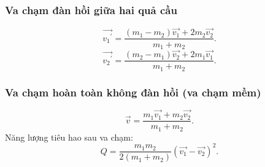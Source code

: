 \subsubsection{Va chạm đàn hồi giữa hai quả cầu}
$$\overrightarrow {{v_1}^\prime }  = \frac{{\left( {{m_1} - {m_2}} \right)\overrightarrow {{v_1}}  + 2{m_2}\overrightarrow {{v_2}} }}{{{m_1} + {m_2}}}.$$
$$\overrightarrow {{v_2}^\prime }  = \frac{{\left( {{m_2} - {m_1}} \right)\overrightarrow {{v_2}}  + 2{m_1}\overrightarrow {{v_1}} }}{{{m_1} + {m_2}}}.$$
\subsubsection{Va chạm hoàn toàn không đàn hồi (va chạm mềm)}
$$\overrightarrow v  = \frac{{{m_1}\overrightarrow {{v_1}}  + {m_2}\overrightarrow {{v_2}} }}{{{m_1} + {m_2}}}.$$
Năng lượng tiêu hao sau va chạm:
$$Q = \frac{{{m_1}{m_2}}}{{2\left( {{m_1} + {m_2}} \right)}}{\left( {\overrightarrow {{v_1}}  - \overrightarrow {{v_2}} } \right)^2}.$$